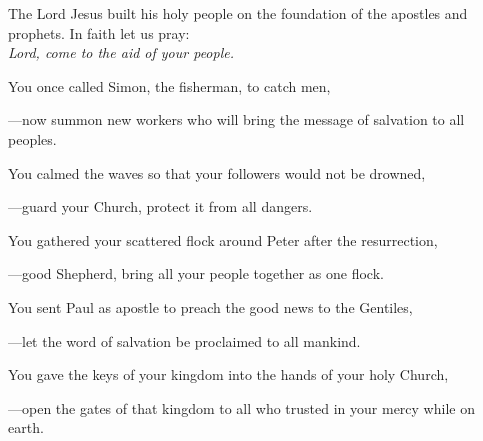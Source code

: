 \intercessions\indent

\begin{hangpar}

The Lord Jesus built his holy people on the foundation of the apostles and prophets. In faith let us pray:\\
\emph{Lord, come to the aid of your people.}

\medskip You once called Simon, the fisherman, to catch men,

{\color{red}---\thinspace}now summon new workers who will bring the message of salvation to all peoples.

\medskip You calmed the waves so that your followers would not be drowned,

{\color{red}---\thinspace}guard your Church, protect it from all dangers.

\medskip You gathered your scattered flock around Peter after the resurrection,

{\color{red}---\thinspace}good Shepherd, bring all your people together as one flock.

\medskip You sent Paul as apostle to preach the good news to the Gentiles,

{\color{red}---\thinspace}let the word of salvation be proclaimed to all mankind.

\medskip You gave the keys of your kingdom into the hands of your holy Church,

{\color{red}---\thinspace}open the gates of that kingdom to all who trusted in your mercy while on earth.

\end{hangpar}
